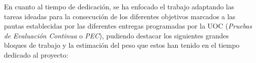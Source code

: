 \documentclass[IB,BIB]{TFUOC}%
\begin{document}
En cuanto al tiempo de dedicación, se ha enfocado el trabajo adaptando las tareas ideadas para la consecución de los diferentes objetivos marcados a las pautas establecidas por las diferentes entregas programadas por la UOC (\textit{Pruebas de Evaluación Continua} o \textit{PEC}), pudiendo destacar los siguientes grandes bloques de trabajo y la estimación del peso que estos han tenido en el tiempo dedicado al proyecto:

\end{document}

